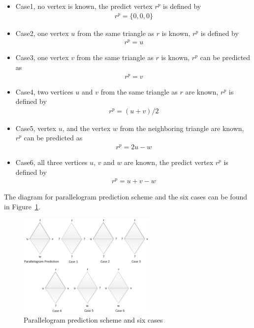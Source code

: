 \documentclass[onecolumn, 12pt]{article}
\begin{document}
\begin{itemize}
\item Case1, no vertex is known, the predict vertex $r^p$ is defined by
\begin{align}\label{eq:case1}
r^p = \{0, 0, 0\}
\end{align}

\item Case2, one vertex $u$ from the same triangle as $r$ is known, $r^p$ is defined by
\begin{align}\label{eq:case2}
r^p = u
\end{align}

\item Case3, one vertex $v$ from the same triangle as $r$ is known, $r^p$ can be predicted as
\begin{align}\label{eq:case3}
r^p = v
\end{align}

\item Case4, two vertices $u$ and $v$ from the same triangle as $r$ are known, $r^p$ is defined by
\begin{align}\label{eq:case4}
r^p = (u + v) / 2
\end{align}

\item Case5, vertex $u$, and the vertex $w$ from the neighboring triangle are known, $r^p$ can be predicted as
\begin{align}\label{eq:case5}
r^p = 2u - w
\end{align}

\item Case6, all three vertices $u$, $v$ and $w$ are known, the predict vertex $r^p$ is defined by
\begin{align}\label{eq:case6}
r^p = u + v - w
\end{align}
\end{itemize}

The diagram for parallelogram prediction scheme and the six cases can be found in Figure~\ref{fig:parallel}.
\begin{figure}[h]
\centering
\includegraphics[width=0.6\textwidth, clip, keepaspectratio]{fig_parallel.eps}
\caption{Parallelogram prediction scheme and six cases}\label{fig:parallel}
\end{figure}
\end{document}

